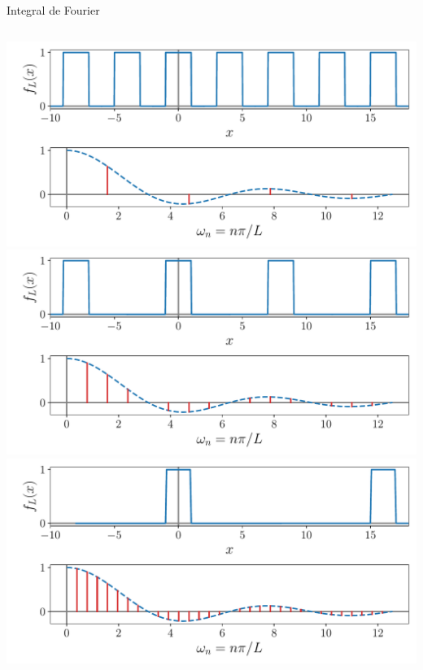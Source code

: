 \documentclass[9pt, aspectratio=169]{beamer}
\begin{document}
\begin{frame}{Integral de Fourier}
\vspace{-1em}
\begin{columns}[c]
\begin{center}
     { \includegraphics[scale=0.5]{figs/fig-01-1.pdf} }
     { \includegraphics[scale=0.5]{figs/fig-01-2.pdf} }
     { \includegraphics[scale=0.5]{figs/fig-01-3.pdf} }
\end{center}
\end{columns}
\end{frame}
\end{document}
